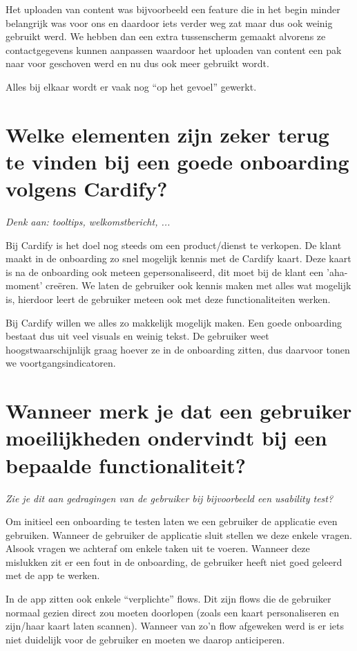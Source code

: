 Het uploaden van content was bijvoorbeeld een feature die in het begin minder belangrijk was voor ons en daardoor iets verder weg zat maar dus ook weinig gebruikt werd. We hebben dan een extra tussenscherm gemaakt alvorens ze contactgegevens kunnen aanpassen waardoor het uploaden van content een pak naar voor geschoven werd en nu dus ook meer gebruikt wordt.

Alles bij elkaar wordt er vaak nog ``op het gevoel'' gewerkt.

\section[Vraag 3]{Welke elementen zijn zeker terug te vinden bij een goede onboarding volgens Cardify?}

\textit{Denk aan: tooltips, welkomstbericht, ...}

Bij Cardify is het doel nog steeds om een product/dienst te verkopen. De klant maakt in de onboarding zo snel mogelijk kennis met de Cardify kaart. Deze kaart is na de onboarding ook meteen gepersonaliseerd, dit moet bij de klant een 'aha-moment' creëren. We laten de gebruiker ook kennis maken met alles wat mogelijk is, hierdoor leert de gebruiker meteen ook met deze functionaliteiten werken.

Bij Cardify willen we alles zo makkelijk mogelijk maken. Een goede onboarding bestaat dus uit veel visuals en weinig tekst. De gebruiker weet hoogstwaarschijnlijk graag hoever ze in de onboarding zitten, dus daarvoor tonen we voortgangsindicatoren.

\section[Vraag 4]{Wanneer merk je dat een gebruiker moeilijkheden ondervindt bij een bepaalde functionaliteit?}

\textit{Zie je dit aan gedragingen van de gebruiker bij bijvoorbeeld een usability test?}

Om initieel een onboarding te testen laten we een gebruiker de applicatie even gebruiken. Wanneer de gebruiker de applicatie sluit stellen we deze enkele vragen. Alsook vragen we achteraf om enkele taken uit te voeren. Wanneer deze mislukken zit er een fout in de onboarding, de gebruiker heeft niet goed geleerd met de app te werken.

In de app zitten ook enkele ``verplichte'' flows. Dit zijn flows die de gebruiker normaal gezien direct zou moeten doorlopen (zoals een kaart personaliseren en zijn/haar kaart laten scannen). Wanneer van zo’n flow afgeweken werd is er iets niet duidelijk voor de gebruiker en moeten we daarop anticiperen.

